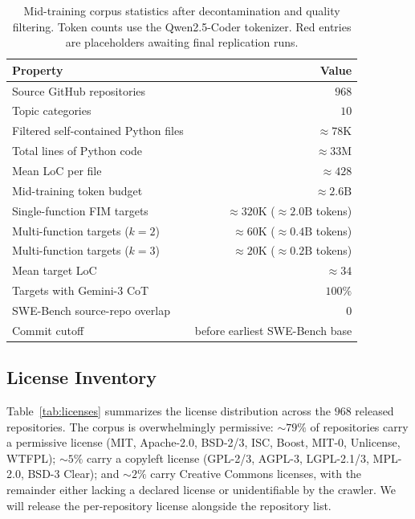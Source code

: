 \begin{table}[h]
\centering
\caption{Mid-training corpus statistics after decontamination and
quality filtering. Token counts use the Qwen2.5-Coder tokenizer.
Red entries are placeholders awaiting final replication runs.}
\label{tab:dataset}
\small
\setlength{\tabcolsep}{6pt}
\begin{tabular}{lr}
\toprule
Property & Value \\
\midrule
Source GitHub repositories                       & $968$ \\
Topic categories                                 & $10$ \\
Filtered self-contained Python files             & $\approx 78\mathrm{K}$ \\
Total lines of Python code                       & $\approx 33\mathrm{M}$ \\
Mean LoC per file                                & $\approx 428$ \\
Mid-training token budget                        & $\approx 2.6\mathrm{B}$ \\
\midrule
Single-function FIM targets                      & $\approx 320\mathrm{K}$ ($\approx 2.0\mathrm{B}$ tokens) \\
Multi-function targets ($k{=}2$)                 & $\approx 60\mathrm{K}$ ($\approx 0.4\mathrm{B}$ tokens) \\
Multi-function targets ($k{=}3$)                 & $\approx 20\mathrm{K}$ ($\approx 0.2\mathrm{B}$ tokens) \\
Mean target LoC                                  & $\approx 34$ \\
Targets with Gemini-3 CoT                        & $100\%$ \\
\midrule
SWE-Bench source-repo overlap                    & $0$ \\
Commit cutoff                                    & before earliest SWE-Bench base \\
\bottomrule
\end{tabular}
\end{table}

\subsection{License Inventory}
\label{app:data:license}

Table~\ref{tab:licenses} summarizes the license distribution across the
$968$ released repositories. The corpus is overwhelmingly permissive:
$\sim\!79\%$ of repositories carry a permissive license (MIT,
Apache-2.0, BSD-2/3, ISC, Boost, MIT-0, Unlicense, WTFPL); $\sim\!5\%$
carry a copyleft license (GPL-2/3, AGPL-3, LGPL-2.1/3, MPL-2.0, BSD-3
Clear); and $\sim\!2\%$ carry Creative Commons licenses, with the
remainder either lacking a declared license or unidentifiable by the
crawler. We will release the per-repository license alongside the
repository list.

